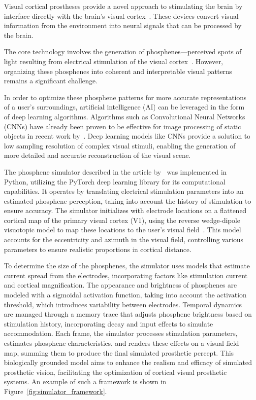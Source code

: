 \documentclass[10pt]{article}
\begin{document}
Visual cortical prostheses provide a novel approach to stimulating the brain by
interface directly with the brain's visual
cortex~\parencite{deruytervansteveninckRealworldIndoorMobility2022}.
These devices convert visual information from the environment into neural
signals that can be processed by the brain.

The core technology involves the generation of phosphenes—perceived spots of
light resulting from electrical stimulation of the visual
cortex~\parencite{vandergrintenBiologicallyPlausiblePhosphene2024}. However,
organizing these phosphenes into coherent and interpretable visual patterns
remains a significant challenge.

In order to optimize these phosphene patterns for more accurate representations
of a user's surroundings, artificial intelligence (AI) can be leveraged in the
form of deep learning algorithms. Algorithms such as Convolutional Neural
Networks (CNNs) have already been proven to be effective for image processing of
static objects in recent work
by~\textcite{deruytervansteveninckEndtoendOptimizationProsthetic2022}. Deep
learning models like CNNs provide a solution to low sampling resolution of
complex visual stimuli, enabling the generation of more detailed and accurate
reconstruction of the visual scene.

The phosphene simulator described in the article
by~\textcite{deruytervansteveninckEndtoendOptimizationProsthetic2022} was
implemented in Python, utilizing the PyTorch deep learning library for its
computational capabilities. It operates by translating electrical stimulation
parameters into an estimated phosphene perception, taking into account the
history of stimulation to ensure accuracy. The simulator initializes with
electrode locations on a flattened cortical map of the primary visual cortex
(V1), using the reverse wedge-dipole visuotopic model to map these locations to
the user's visual field~\parencite{liWearableComputerVision2013}. This model
accounts for the eccentricity and azimuth in the visual field, controlling
various parameters to ensure realistic proportions in cortical distance.

To determine the size of the phosphenes, the simulator uses models that estimate
current spread from the electrodes, incorporating factors like stimulation
current and cortical magnification. The appearance and brightness of phosphenes
are modeled with a sigmoidal activation function, taking into account the
activation threshold, which introduces variability between electrodes. Temporal
dynamics are managed through a memory trace that adjusts phosphene brightness
based on stimulation history, incorporating decay and input effects to simulate
accommodation. Each frame, the simulator processes stimulation parameters,
estimates phosphene characteristics, and renders these effects on a visual field
map, summing them to produce the final simulated prosthetic percept. This
biologically grounded model aims to enhance the realism and efficacy of
simulated prosthetic vision, facilitating the optimization of cortical visual
prosthetic systems. An example of such a framework is shown in Figure~\ref{fig:simulator_framework}.
\end{document}
